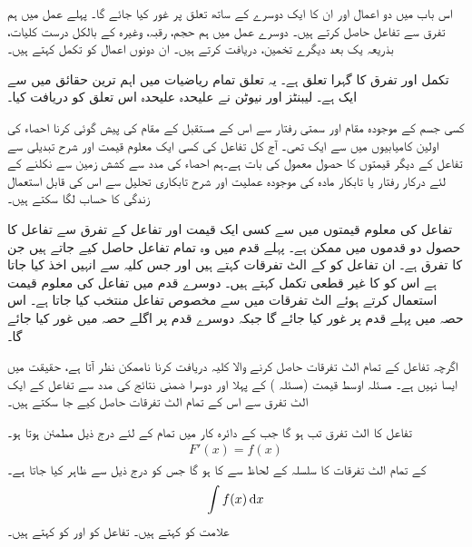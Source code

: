 اس باب میں دو اعمال اور ان کا ایک دوسرے کے ساتھ تعلق پر غور کیا جائے گا۔ پہلے عمل میں  ہم تفرق سے تفاعل  حاصل کرتے ہیں۔ دوسرے عمل میں ہم حجم، رقبہ، وغیرہ کے بالکل درست کلیات، بذریعہ یک بعد دیگرے تخمین، دریافت کرتے ہیں۔ ان دونوں اعمال کو تکمل کہتے ہیں۔

تکمل اور تفرق کا گہرا تعلق ہے۔ یہ تعلق تمام ریاضیات میں اہم ترین حقائق میں سے ایک ہے۔ لیبنٹز اور نیوٹن نے علیحدہ علیحدہ اس تعلق کو دریافت کیا۔

کسی جسم کے موجودہ مقام اور سمتی رفتار سے اس کے مستقبل کے  مقام کی پیش گوئی کرنا احصاء کی اولین کامیابیوں میں سے ایک تھی۔ آج کل تفاعل کی کسی  ایک معلوم قیمت اور شرح تبدیلی سے تفاعل کے دیگر قیمتوں کا حصول معمول کی بات ہے۔ہم احصاء کی مدد سے  کشش زمین سے نکلنے کے لئے درکار رفتار یا تابکار مادہ کی موجودہ عملیت اور شرح تابکاری تحلیل سے اس کی قابل استعمال زندگی کا حساب لگا سکتے ہیں۔

تفاعل کی معلوم قیمتوں میں سے کسی ایک قیمت اور تفاعل کے تفرق  سے تفاعل کا حصول دو قدموں میں ممکن ہے۔ پہلے قدم میں وہ تمام تفاعل حاصل کیے جاتے ہیں جن کا تفرق  ہے۔ ان تفاعل کو  کے الٹ تفرقات کہتے ہیں اور جس کلیہ سے انہیں اخذ کیا جاتا ہے اس کو  کا غیر قطعی  تکمل  کہتے ہیں۔ دوسرے قدم میں تفاعل کی معلوم قیمت استعمال کرتے ہوئے الٹ تفرقات میں سے مخصوص تفاعل منتخب کیا جاتا ہے۔ اس حصہ میں پہلے قدم پر غور کیا جائے گا جبکہ دوسرے قدم پر اگلے حصہ میں غور کیا جائے گا۔

اگرچہ تفاعل کے تمام الٹ تفرقات حاصل کرنے والا کلیہ دریافت کرنا  ناممکن نظر آتا ہے، حقیقت میں ایسا نہیں ہے۔ مسئلہ اوسط قیمت (مسئلہ ) کے  پہلا اور دوسرا ضمنی نتائج کی مدد سے تفاعل کے  ایک الٹ تفرق سے اس کے تمام الٹ تفرقات حاصل کیے جا سکتے ہیں۔ 

تفاعل  کا  الٹ تفرق تب  ہو گا جب  کے دائرہ کار میں تمام  کے لئے درج ذیل مطمئن ہوتا ہو۔
\begin{align*}
F'(x)=f(x)
\end{align*}
 کے تمام الٹ تفرقات کا سلسلہ  کے لحاظ سے  کا  ہو گا جس کو درج ذیل سے ظاہر کیا جاتا ہے۔
\begin{align*}
\int f(x)\dif x
\end{align*}
علامت  کو  کہتے ہیں۔ تفاعل  کو  اور  کو  کہتے ہیں۔

